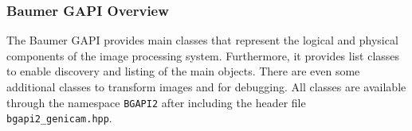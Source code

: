 \subsubsection{Baumer GAPI Overview}
\label{subsubsec:baumer_gapi_overview}

The Baumer GAPI provides main classes that represent the logical and physical components of the image processing system.
Furthermore, it provides list classes to enable discovery and listing of the main objects.
There are even some additional classes to transform images and for debugging.
All classes are available through the namespace \texttt{BGAPI2} after including the header file \texttt{bgapi2\_genicam.hpp}.


